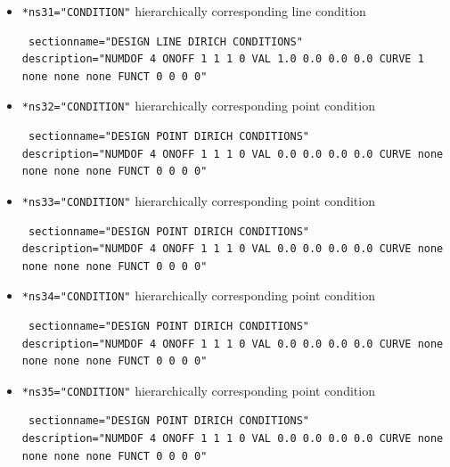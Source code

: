 \begin{itemize}
\item \verb|*ns31="CONDITION"| \qquad hierarchically corresponding line condition
\begin{small} \begin{verbatim} sectionname="DESIGN LINE DIRICH CONDITIONS"
description="NUMDOF 4 ONOFF 1 1 1 0 VAL 1.0 0.0 0.0 0.0 CURVE 1 none none none FUNCT 0 0 0 0"
\end{verbatim} \end{small}

\item \verb|*ns32="CONDITION"| \qquad hierarchically corresponding point condition
\begin{small} \begin{verbatim} sectionname="DESIGN POINT DIRICH CONDITIONS"
description="NUMDOF 4 ONOFF 1 1 1 0 VAL 0.0 0.0 0.0 0.0 CURVE none none none none FUNCT 0 0 0 0"
\end{verbatim} \end{small}

 \item \verb|*ns33="CONDITION"| \qquad hierarchically corresponding point condition
\begin{small} \begin{verbatim} sectionname="DESIGN POINT DIRICH CONDITIONS"
description="NUMDOF 4 ONOFF 1 1 1 0 VAL 0.0 0.0 0.0 0.0 CURVE none none none none FUNCT 0 0 0 0"
\end{verbatim} \end{small}

 \item \verb|*ns34="CONDITION"| \qquad hierarchically corresponding point condition
\begin{small} \begin{verbatim} sectionname="DESIGN POINT DIRICH CONDITIONS"
description="NUMDOF 4 ONOFF 1 1 1 0 VAL 0.0 0.0 0.0 0.0 CURVE none none none none FUNCT 0 0 0 0"
\end{verbatim} \end{small}

\item \verb|*ns35="CONDITION"| \qquad hierarchically corresponding point condition
\begin{small} \begin{verbatim} sectionname="DESIGN POINT DIRICH CONDITIONS"
description="NUMDOF 4 ONOFF 1 1 1 0 VAL 0.0 0.0 0.0 0.0 CURVE none none none none FUNCT 0 0 0 0"
\end{verbatim} \end{small}


\end{itemize}
